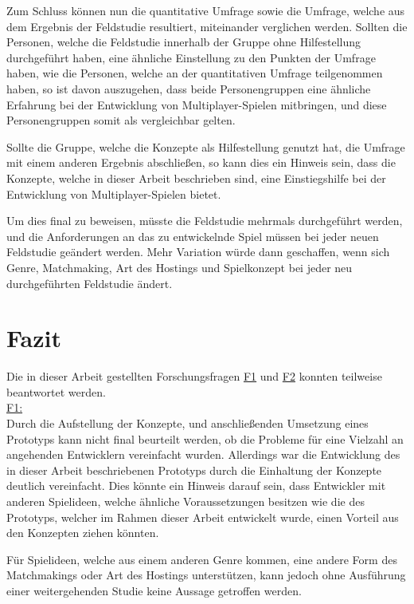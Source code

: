 Zum Schluss können nun die quantitative Umfrage sowie die Umfrage, welche aus dem Ergebnis der Feldstudie resultiert, miteinander verglichen werden. Sollten die Personen, welche die Feldstudie innerhalb der Gruppe ohne Hilfestellung durchgeführt haben, eine ähnliche Einstellung zu den Punkten der Umfrage haben, wie die Personen, welche an der quantitativen Umfrage teilgenommen haben, so ist davon auszugehen, dass beide Personengruppen eine ähnliche Erfahrung bei der Entwicklung von Multiplayer-Spielen mitbringen, und diese Personengruppen somit als vergleichbar gelten.

Sollte die Gruppe, welche die Konzepte als Hilfestellung genutzt hat, die Umfrage mit einem anderen Ergebnis abschließen, so kann dies ein Hinweis sein, dass die Konzepte, welche in dieser Arbeit beschrieben sind, eine Einstiegshilfe bei der Entwicklung von Multiplayer-Spielen bietet.

Um dies final zu beweisen, müsste die Feldstudie mehrmals durchgeführt werden, und die Anforderungen an das zu entwickelnde Spiel müssen bei jeder neuen Feldstudie geändert werden. Mehr Variation würde dann geschaffen, wenn sich Genre, Matchmaking, Art des Hostings und Spielkonzept bei jeder neu durchgeführten Feldstudie ändert.


\section{Fazit}

Die in dieser Arbeit gestellten Forschungsfragen \hyperref[f1]{F1} und \hyperref[f2]{F2} konnten teilweise beantwortet werden. \\
\hyperref[f1]{F1:} \\
Durch die Aufstellung der Konzepte, und anschließenden Umsetzung eines Prototyps kann nicht final beurteilt werden, ob die Probleme für eine Vielzahl an angehenden Entwicklern vereinfacht wurden. Allerdings war die Entwicklung des in dieser Arbeit beschriebenen Prototyps durch die Einhaltung der Konzepte deutlich vereinfacht. Dies könnte ein Hinweis darauf sein, dass Entwickler mit anderen Spielideen, welche ähnliche Voraussetzungen besitzen wie die des Prototyps, welcher im Rahmen dieser Arbeit entwickelt wurde, einen Vorteil aus den Konzepten ziehen könnten.

Für Spielideen, welche aus einem anderen Genre kommen, eine andere Form des Matchmakings oder Art des Hostings unterstützen, kann jedoch ohne Ausführung einer weitergehenden Studie keine Aussage getroffen werden.

